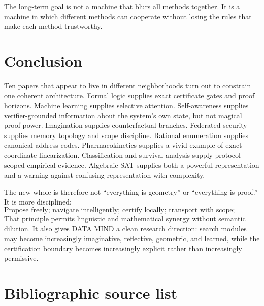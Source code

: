 \documentclass[11pt]{article}
\theoremstyle{special}
\theoremstyle{definition}
\begin{document}
The long-term goal is not a machine that blurs all methods together. It is a machine in which different methods can cooperate without losing the rules that make each method trustworthy.

\section{Conclusion}

Ten papers that appear to live in different neighborhoods turn out to constrain one coherent architecture. Formal logic supplies exact certificate gates and proof horizons. Machine learning supplies selective attention. Self-awareness supplies verifier-grounded information about the system's own state, but not magical proof power. Imagination supplies counterfactual branches. Federated security supplies memory topology and scope discipline. Rational enumeration supplies canonical address codes. Pharmacokinetics supplies a vivid example of exact coordinate linearization. Classification and survival analysis supply protocol-scoped empirical evidence. Algebraic SAT supplies both a powerful representation and a warning against confusing representation with complexity.

The new whole is therefore not ``everything is geometry'' or ``everything is proof.'' It is more disciplined:
\[
\boxed{\text{Propose freely; navigate intelligently; certify locally; transport with scope; remember with provenance.}}
\]
That principle permits linguistic and mathematical synergy without semantic dilution. It also gives DATA MIND a clean research direction: search modules may become increasingly imaginative, reflective, geometric, and learned, while the certification boundary becomes increasingly explicit rather than increasingly permissive.

\appendix
\section{Bibliographic source list}
\end{document}
